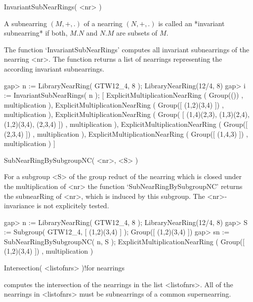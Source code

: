 

\>InvariantSubNearRings( <nr> )

A subnearring $(M,+,.)$ of a nearring $(N,+,.)$ is called an 
*invariant subnearring* if both, $M . N$ and $N . M$ are subsets of $M$.

The function `InvariantSubNearRings'  computes all invariant 
subnearrings of the nearring <nr>.
The function returns a list of nearrings representing the according 
invariant subnearrings.

\beginexample
    gap> n := LibraryNearRing( GTW12_4, 8 );            
    LibraryNearRing(12/4, 8)
    gap> i := InvariantSubNearRings( n );
    [ ExplicitMultiplicationNearRing ( Group(()) , multiplication ), 
      ExplicitMultiplicationNearRing ( Group([ (1,2)(3,4) ]) , multiplication ),
      ExplicitMultiplicationNearRing ( Group(
        [ (1,4)(2,3), (1,3)(2,4), (1,2)(3,4), (2,3,4) ]) , multiplication ), 
      ExplicitMultiplicationNearRing ( Group([ (2,3,4) ]) , multiplication ), 
      ExplicitMultiplicationNearRing ( Group([ (1,4,3) ]) , multiplication ) ]
\endexample



\>SubNearRingBySubgroupNC( <nr>, <S> )

For a subgroup <S> of the group reduct of the nearring which is closed
under the multiplication of <nr> the function
`SubNearRingBySubgroupNC' returns the subnearRing of <nr>, which is
induced by this subgroup. The <nr>-invariance is not explicitely
tested.

\beginexample
    gap> n := LibraryNearRing( GTW12_4, 8 );            
    LibraryNearRing(12/4, 8)
    gap> S := Subgroup( GTW12_4, [ (1,2)(3,4) ] );
    Group([ (1,2)(3,4) ])
    gap> sn := SubNearRingBySubgroupNC( n, S );
    ExplicitMultiplicationNearRing ( Group([ (1,2)(3,4) ]) , multiplication )
\endexample



\>Intersection( <listofnrs> )!{for nearrings}

computes the intersection of the nearrings in the list <listofnrs>.
All of the nearrings in <listofnrs> must be subnearrings of a common
supernearring.

